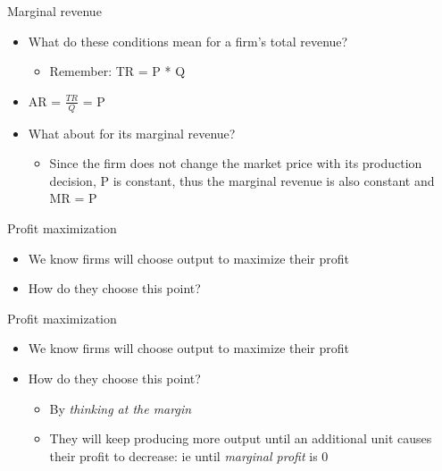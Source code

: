 \documentclass[aspectratio=169]{beamer}
\begin{document}
\begin{frame}{Marginal revenue}
    \begin{itemize}
        \item What do these conditions mean for a firm's total revenue? 
            \begin{itemize}
                \item Remember: TR = P * Q
            \end{itemize}
        \item AR = $\frac{TR}{Q}$ = P
        \item What about for its marginal revenue?
        \begin{itemize}
            \item Since the firm does not change the market price with its production decision, P is constant, thus the marginal revenue is also constant and MR = P
        \end{itemize}
    \end{itemize}
\end{frame}

\begin{frame}{Profit maximization}
    \begin{itemize}
        \item We know firms will choose output to maximize their profit
        \item How do they choose this point?
    \end{itemize}
\end{frame}

\begin{frame}{Profit maximization}
    \begin{itemize}
        \item We know firms will choose output to maximize their profit
        \item How do they choose this point?
            \begin{itemize}
                \item By \textit{thinking at the margin}
                \item They will keep producing more output until an additional unit causes their profit to decrease: ie until \textit{marginal profit} is 0
            \end{itemize}
    \end{itemize}
\end{frame}
\end{document}
